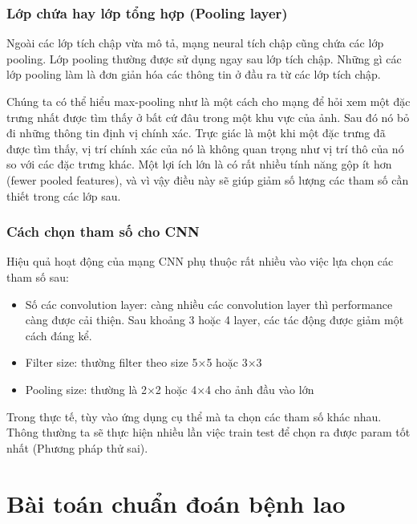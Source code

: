 \subsubsection{Lớp chứa hay lớp tổng hợp (Pooling layer)}
Ngoài các lớp tích chập vừa mô tả, mạng neural tích chập cũng chứa các lớp pooling. Lớp pooling thường được sử dụng ngay sau lớp tích chập. Những gì các lớp pooling làm là đơn giản hóa các thông tin ở đầu ra từ các lớp tích chập. 

Chúng ta có thể hiểu max-pooling như là một cách cho mạng để hỏi xem một đặc trưng nhất được tìm thấy ở bất cứ đâu trong một khu vực của ảnh. Sau đó nó bỏ đi những thông tin định vị chính xác. Trực giác là một khi một đặc trưng đã được tìm thấy, vị trí chính xác của nó là không quan trọng như vị trí thô của nó so với các đặc trưng khác. Một lợi ích lớn là có rất nhiều tính năng gộp ít hơn (fewer pooled features), và vì vậy điều này sẽ giúp giảm số lượng các tham số cần thiết trong các lớp sau.

\subsubsection{Cách chọn tham số cho CNN}
Hiệu quả hoạt động của mạng CNN phụ thuộc rất nhiều vào việc lựa chọn các tham số sau:

\begin{itemize}
	\item Số các convolution layer: càng nhiều các convolution layer thì performance càng được cải thiện. Sau khoảng 3 hoặc 4 layer, các tác động được giảm một cách đáng kể.
	\item Filter size: thường filter theo size 5×5 hoặc 3×3
	\item Pooling size: thường là 2×2 hoặc 4×4 cho ảnh đầu vào lớn
\end{itemize}

Trong thực tế, tùy vào ứng dụng cụ thể mà ta chọn các tham số khác nhau. Thông thường ta sẽ thực hiện nhiều lần việc train test để chọn ra được param tốt nhất (Phương pháp thử sai).

\section{Bài toán chuẩn đoán bệnh lao}
